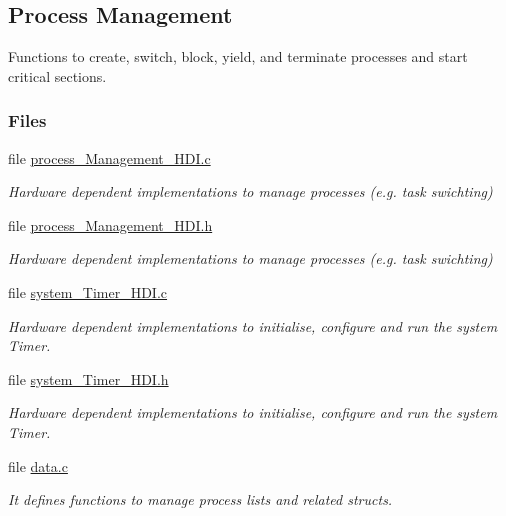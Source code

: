 \hypertarget{group__process}{}\subsection{Process Management}
\label{group__process}


Functions to create, switch, block, yield, and terminate processes and start critical sections.  


\subsubsection*{Files}
\begin{DoxyCompactItemize}
\item 
file \hyperlink{process__Management__HDI_8c}{process\+\_\+\+Management\+\_\+\+H\+D\+I.\+c}
\begin{DoxyCompactList}\small\item\em Hardware dependent implementations to manage processes (e.\+g. task swichting) \end{DoxyCompactList}\item 
file \hyperlink{process__Management__HDI_8h}{process\+\_\+\+Management\+\_\+\+H\+D\+I.\+h}
\begin{DoxyCompactList}\small\item\em Hardware dependent implementations to manage processes (e.\+g. task swichting) \end{DoxyCompactList}\item 
file \hyperlink{system__Timer__HDI_8c}{system\+\_\+\+Timer\+\_\+\+H\+D\+I.\+c}
\begin{DoxyCompactList}\small\item\em Hardware dependent implementations to initialise, configure and run the system Timer. \end{DoxyCompactList}\item 
file \hyperlink{system__Timer__HDI_8h}{system\+\_\+\+Timer\+\_\+\+H\+D\+I.\+h}
\begin{DoxyCompactList}\small\item\em Hardware dependent implementations to initialise, configure and run the system Timer. \end{DoxyCompactList}\item 
file \hyperlink{data_8c}{data.\+c}
\begin{DoxyCompactList}\small\item\em It defines functions to manage process lists and related structs. \end{DoxyCompactList}\item 

\end{DoxyCompactItemize}
